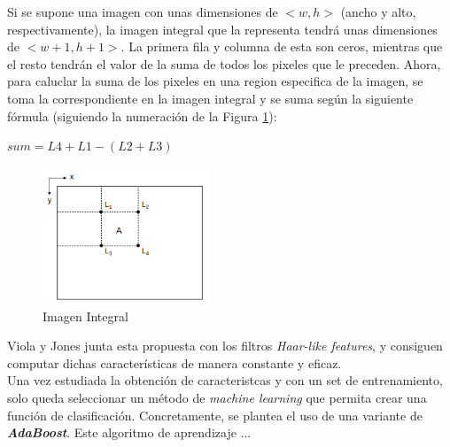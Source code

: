 Si se supone una imagen con unas dimensiones de $<w,h>$ (ancho y alto, respectivamente), la imagen integral que la representa tendrá unas dimensiones de $<w+1,h+1>$. La primera fila y columna de esta son ceros, mientras que el resto tendrán el valor de la suma de todos los pixeles que le preceden. \cite{integral-web} Ahora, para caluclar la suma de los pixeles en una region especifica de la imagen, se toma la correspondiente en la imagen integral y se suma según la siguiente fórmula (siguiendo la numeración de la Figura \ref{fig:integral}):
\begin{center}
	$sum = L4 + L1 - (L2 + L3)$ 
\end{center}
\begin{figure}[htp]
	\centering
	\includegraphics[width=5cm]{imagenes/integral.png}
	\caption{Imagen Integral}
	\label{fig:integral}
\end{figure}

Viola y Jones junta esta propuesta con los filtros \textit{Haar-like features}, y consiguen computar dichas características de manera constante y eficaz. \cite{integral}\\


%
\newpage
Una vez estudiada la obtención de caracteristcas y con un set de entrenamiento, solo queda seleccionar un método de \textit{machine learning} que permita crear una función de clasificación. Concretamente, se plantea el uso de una variante de \textbf{\textit{AdaBoost}}. Este algoritmo de aprendizaje ...



%
%
%

